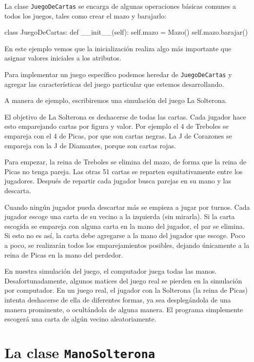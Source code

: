 La clase \texttt{JuegoDeCartas} se encarga de algunas operaciones
básicas comunes a todos los juegos, tales como crear el mazo y barajarlo:

\begin{pythoncode}
class JuegoDeCartas:
  def __init__(self):
    self.mazo = Mazo()
    self.mazo.barajar()
\end{pythoncode}
 En este ejemplo vemos que la inicialización realiza algo más importante
que asignar valores iniciales a los atributos.

Para implementar un juego específico podemos heredar de \texttt{JuegoDeCartas}
y agregar las características del juego particular que estemos desarrollando.

A manera de ejemplo, escribiremos una simulación del juego La Solterona.

El objetivo de La Solterona es deshacerse de todas las cartas. Cada
jugador hace esto emparejando cartas por figura y valor. Por ejemplo
el 4 de Treboles se empareja con el 4 de Picas, por que son cartas
negras. La J de Corazones se empareja con la J de Diamantes, porque
son cartas rojas.

Para empezar, la reina de Treboles se elimina del mazo, de forma que
la reina de Picas no tenga pareja. Las otras 51 cartas se reparten
equitativamente entre los jugadores. Después de repartir cada jugador
busca parejas en su mano y las descarta.

Cuando ningún jugador pueda descartar más se empieza a jugar por turnos.
Cada jugador escoge una carta de su vecino a la izquierda (sin mirarla).
Si la carta escogida se empareja con alguna carta en la mano del jugador,
el par se elimina. Si esto no es así, la carta debe agregarse a la
mano del jugador que escoge. Poco a poco, se realizarán todos los
emparejamientos posibles, dejando únicamente a la reina de Picas en
la mano del perdedor.

En nuestra simulación del juego, el computador juega todas las manos.
Desafortunadamente, algunos matices del juego real se pierden en la
simulación por computador. En un juego real, el jugador con la Solterona
(la reina de Picas) intenta deshacerse de ella de diferentes formas,
ya sea desplegándola de una manera prominente, o ocultándola de alguna
manera. El programa simplemente escogerá una carta de algún vecino
aleatoriamente.

\section{La clase \texttt{ManoSolterona}}

